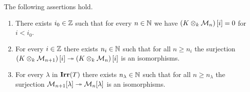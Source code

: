 \begin{lemma}\label{lemma:boundedness_of_gradation_and_two_stabilizations}
The following assertions hold.
\begin{enumerate}[label=\emph{\textbf{(\arabic*)}}, leftmargin=3.0em]
\item There exists $i_0\in {\mathbb Z}$ such that for every $n\in {\mathbb N}$ we have $\left(K\otimes_k{\mathcal M}_n\right)[i] = 0$ for $i< i_0$.
\item For every $i\in {\mathbb Z}$ there exists $n_i\in {\mathbb N}$ such that for all $n\geq n_i$ the surjection $\left(K\otimes_k{\mathcal M}_{n+1}\right)[i]\twoheadrightarrow \left(K\otimes_k{\mathcal M}_n\right)[i]$ is an isomorphisms.
\item For every $\lambda$ in $\mathbf{Irr}(T)$ there exists $n_{\lambda}\in {\mathbb N}$ such that for all $n\geq n_{\lambda}$ the surjection ${\mathcal M}_{n+1}[\lambda]\twoheadrightarrow {\mathcal M}_n[\lambda]$ is an isomorphisms.
\end{enumerate}
\end{lemma}
